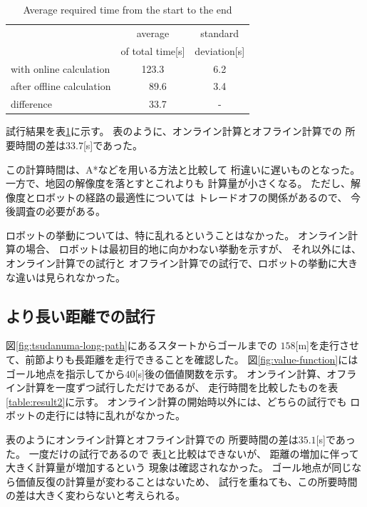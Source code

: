 \documentclass{jarticle}
\begin{document}
\begin{table}[hbtp]
	\caption{Average required time from the start to the end}
	\label{table:result}
	\centering
	\begin{small}
	 \begin{tabular}{l|cc}
		\hline
		 & average & standard \\
		 & of total time[s] & deviation[s] \\
		\hline \hline
		with online calculation & 123.3 & 6.2 \\
		after offline calculation &\ \ 89.6 & 3.4 \\
		\hline
		 difference & \ \ 33.7 & - \\
		\hline
	 \end{tabular}
	\end{small}
\end{table}

試行結果を表\ref{table:result}に示す。
表のように、オンライン計算とオフライン計算での
所要時間の差は$33.7$[s]であった。

この計算時間は、A*などを用いる方法と比較して
桁違いに遅いものとなった。
一方で、地図の解像度を落とすとこれよりも
計算量が小さくなる。
ただし、解像度とロボットの経路の最適性については
トレードオフの関係があるので、
今後調査の必要がある。

ロボットの挙動については、特に乱れるということはなかった。
オンライン計算の場合、
ロボットは最初目的地に向かわない挙動を示すが、
それ以外には、オンライン計算での試行と
オフライン計算での試行で、ロボットの挙動に大きな違いは見られなかった。

\subsection{より長い距離での試行}

図\ref{fig:tsudanuma-long-path}にあるスタートからゴールまでの
$158$[m]を走行させて、前節よりも長距離を走行できることを確認した。
図\ref{fig:value-function}にはゴール地点を指示してから$40$[s]後の価値関数を示す。
オンライン計算、オフライン計算を一度ずつ試行しただけであるが、
走行時間を比較したものを表\ref{table:result2}に示す。
オンライン計算の開始時以外には、どちらの試行でも
ロボットの走行には特に乱れがなかった。

表のようにオンライン計算とオフライン計算での
所要時間の差は$35.1$[s]であった。
一度だけの試行であるので
表\ref{table:result}と比較はできないが、
距離の増加に伴って大きく計算量が増加するという
現象は確認されなかった。
ゴール地点が同じなら価値反復の計算量が変わることはないため、
試行を重ねても、この所要時間の差は大きく変わらないと考えられる。
\end{document}

